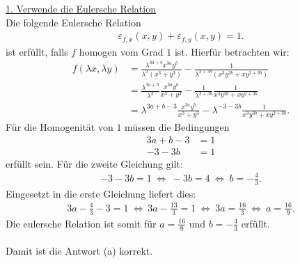\underline{1. Verwende die Eulersche Relation}\\
Die folgende Eulersche Relation 
\begin{align*}
	\varepsilon_{f,x}(x,y) + \varepsilon_{f,y}(x,y) 
	= 1.
\end{align*}
ist erfüllt, falls $f$ homogen vom Grad $1$ ist. Hierfür betrachten wir:
\begin{align*}
	f(\lambda x , \lambda y)
	&=
	\frac{\lambda^{3a + b} x^{3a} y^b}{\lambda^3 (x^3 + y^3)}
	-
	\frac{1}{
	\lambda^{3 + 3b}
	(
	x^3 y^{3b} + x y^{2+ 3b}
	)
	}\\
	&= 
	\frac{\lambda^{3a + b}}{\lambda^3}
	\frac{x^{3a} y^b}{x^3 + y^3}
	-
	\frac{1}{\lambda^{3 + 3b}}
	\frac{1}{
		x^3 y^{3b} + x y^{2+ 3b}
	}\\
	&= 
	\lambda^{3a + b -3 }
	\frac{x^{3a} y^b}{x^3 + y^3}
	-
	\lambda^{-3 - 3b}
	\frac{1}{
		x^3 y^{3b} + x y^{2+ 3b}
	}.
\end{align*}
Für die Homogenität von $1$ müssen die Bedingungen
\begin{align*}
	3a + b - 3 &= 1\\
	-3 - 3b &= 1
\end{align*}
erfüllt sein. Für die zweite Gleichung gilt:
\begin{align*}
	-3 -3 b = 1  
	\ \Leftrightarrow \
	-3 b = 4 
	\ \Leftrightarrow \
	b = - \frac{4}{3}.
\end{align*}
Eingesetzt in die erste Gleichung liefert dies:
\begin{align*}
	3a - \frac{4}{3}  -3 = 1
	\ \Leftrightarrow \
	3a - \frac{13}{3}  = 1 
	\ \Leftrightarrow \
	3a = \frac{16}{3}
	\ \Leftrightarrow \
	 a  = \frac{16}{9}.
\end{align*}
Die eulersche Relation ist somit für $a  = \frac{16}{9}$ und $b = - \frac{4}{3}$ erfüllt.\\
\\
Damit ist die Antwort (a) korrekt.